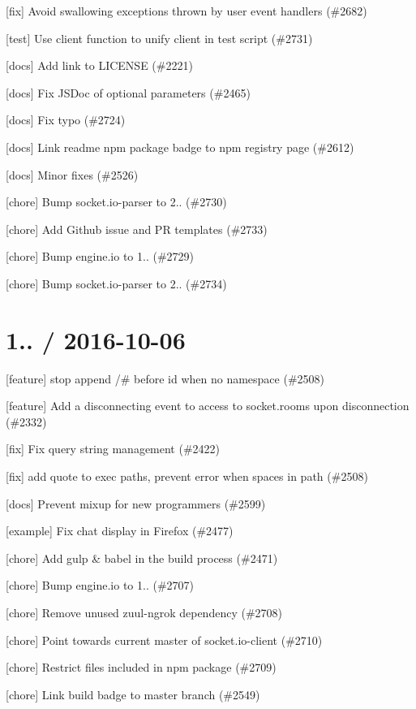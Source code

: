 \begin{DoxyItemize}
\item \mbox{[}fix\mbox{]} Avoid swallowing exceptions thrown by user event handlers (\#2682)
\item \mbox{[}test\mbox{]} Use client function to unify {\ttfamily client} in test script (\#2731)
\item \mbox{[}docs\mbox{]} Add link to L\+I\+C\+E\+N\+SE (\#2221)
\item \mbox{[}docs\mbox{]} Fix J\+S\+Doc of optional parameters (\#2465)
\item \mbox{[}docs\mbox{]} Fix typo (\#2724)
\item \mbox{[}docs\mbox{]} Link readme npm package badge to npm registry page (\#2612)
\item \mbox{[}docs\mbox{]} Minor fixes (\#2526)
\item \mbox{[}chore\mbox{]} Bump socket.\+io-\/parser to 2.. (\#2730)
\item \mbox{[}chore\mbox{]} Add Github issue and PR templates (\#2733)
\item \mbox{[}chore\mbox{]} Bump engine.\+io to 1.. (\#2729)
\item \mbox{[}chore\mbox{]} Bump socket.\+io-\/parser to 2.. (\#2734)
\end{DoxyItemize}

\section*{1.. / 2016-\/10-\/06 }


\begin{DoxyItemize}
\item \mbox{[}feature\mbox{]} stop append /\# before id when no namespace (\#2508)
\item \mbox{[}feature\mbox{]} Add a \textquotesingle{}disconnecting\textquotesingle{} event to access to socket.\+rooms upon disconnection (\#2332)
\item \mbox{[}fix\mbox{]} Fix query string management (\#2422)
\item \mbox{[}fix\mbox{]} add quote to exec paths, prevent error when spaces in path (\#2508)
\item \mbox{[}docs\mbox{]} Prevent mixup for new programmers (\#2599)
\item \mbox{[}example\mbox{]} Fix chat display in Firefox (\#2477)
\item \mbox{[}chore\mbox{]} Add gulp \& babel in the build process (\#2471)
\item \mbox{[}chore\mbox{]} Bump engine.\+io to 1.. (\#2707)
\item \mbox{[}chore\mbox{]} Remove unused zuul-\/ngrok dependency (\#2708)
\item \mbox{[}chore\mbox{]} Point towards current master of socket.\+io-\/client (\#2710)
\item \mbox{[}chore\mbox{]} Restrict files included in npm package (\#2709)
\item \mbox{[}chore\mbox{]} Link build badge to master branch (\#2549)
\end{DoxyItemize}

